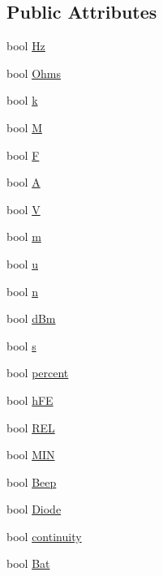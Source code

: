 \subsection*{Public Attributes}
\begin{DoxyCompactItemize}
\item 
bool \hyperlink{struct_flags_a303b4b586da31534de55480d7012673c}{Hz}
\item 
bool \hyperlink{struct_flags_a5f33fa7811a65ddb67bcadb33501b757}{Ohms}
\item 
bool \hyperlink{struct_flags_a64928a5b45606df51a78c33712305d59}{k}
\item 
bool \hyperlink{struct_flags_a9c6824bccd0429e2502db2f09f7ca389}{M}
\item 
bool \hyperlink{struct_flags_a1203a8b6d271d2bb44a1c6e515fb10e4}{F}
\item 
bool \hyperlink{struct_flags_a077d7fc9ad4328f5be164385e55ce9b2}{A}
\item 
bool \hyperlink{struct_flags_a9750f152539ef616f76a163bd6009198}{V}
\item 
bool \hyperlink{struct_flags_a5ec31719223a75461c14fb1c00a2bf35}{m}
\item 
bool \hyperlink{struct_flags_a61cb6fc897ed9d5b699ed03135057411}{u}
\item 
bool \hyperlink{struct_flags_a5c1dace20f5aa69a46f6d8ec477595f9}{n}
\item 
bool \hyperlink{struct_flags_a6396346b074249be6cda7707e443c15d}{d\-Bm}
\item 
bool \hyperlink{struct_flags_ac73ea81cd87a06574ff432a073298f15}{s}
\item 
bool \hyperlink{struct_flags_a89117cb0a2f69799a108594512985224}{percent}
\item 
bool \hyperlink{struct_flags_a24368d5a24643ac438be8916bb2c6581}{h\-F\-E}
\item 
bool \hyperlink{struct_flags_ad1097dab069d0300050facba2594321e}{R\-E\-L}
\item 
bool \hyperlink{struct_flags_a890e103e5f630b2c14506b620291f5ec}{M\-I\-N}
\item 
bool \hyperlink{struct_flags_ac01b592426c267d0c23a9fd1455664e5}{Beep}
\item 
bool \hyperlink{struct_flags_a522be55afbe8633bd34842bebff46c5f}{Diode}
\item 
bool \hyperlink{struct_flags_a4ba413fd7140ee1358ad63dc14bac7cc}{continuity}
\item 
bool \hyperlink{struct_flags_a7dac4dca6fd0931b47ebf9a02f9fb700}{Bat}
\item 

\end{DoxyCompactItemize}
